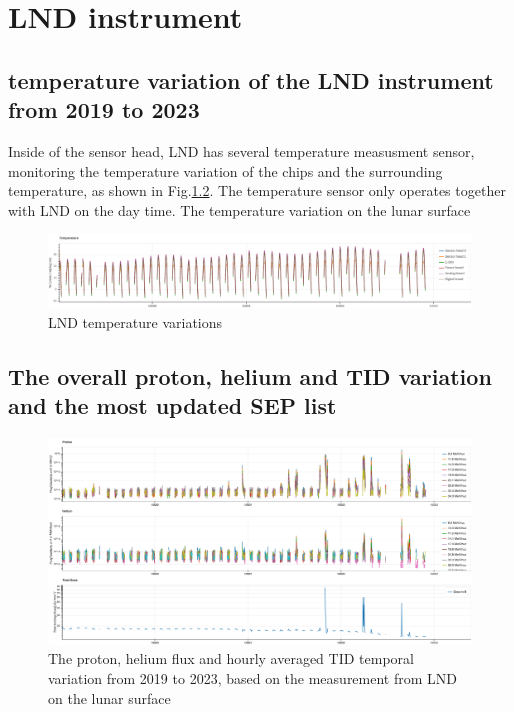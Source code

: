\chapter{LND instrument}
\label{chp:GCS_Python}

\section{temperature variation of the LND instrument from 2019 to 2023}

Inside of the sensor head, LND has several temperature measusment sensor, monitoring the temperature variation of the chips and the surrounding temperature, as shown in Fig.\ref{}. The temperature sensor only operates together with LND on the day time. 
The temperature variation on the lunar surface

\begin{figure}
    \centerfloat
    \includegraphics[angle = 90, width = \textwidth, height = \textheight]{images/lnd_temperature.png}
    \caption{LND temperature variations}
    \label{}
\end{figure}


\section{The overall proton, helium and TID variation and the most updated SEP list}

\begin{figure}
    \centerfloat
    \includegraphics[angle = 90, width = 0.9\textheight, height = 0.8\textwidth]{images/LND-proton-helium-TID.png}
    \caption[The overview variation of proton and helium flux and \ac{TID}]{The proton, helium flux and hourly averaged \ac{TID} temporal variation from 2019 to 2023, based on the measurement from \ac{LND} on the lunar surface}
    \label{Fig:appendix_LND_proton_helium_TID}
\end{figure}

